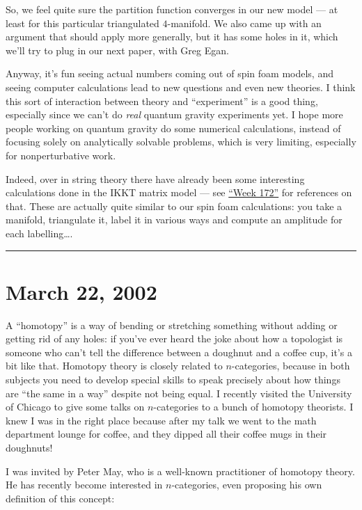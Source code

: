 \documentclass{article}
\begin{document}
So, we feel quite sure the partition function converges in our new model
--- at least for this particular triangulated \(4\)-manifold. We also
came up with an argument that should apply more generally, but it has
some holes in it, which we'll try to plug in our next paper, with Greg
Egan.

Anyway, it's fun seeing actual numbers coming out of spin foam models,
and seeing computer calculations lead to new questions and even new
theories. I think this sort of interaction between theory and
``experiment'' is a good thing, especially since we can't do \emph{real}
quantum gravity experiments yet. I hope more people working on quantum
gravity do some numerical calculations, instead of focusing solely on
analytically solvable problems, which is very limiting, especially for
nonperturbative work.

Indeed, over in string theory there have already been some interesting
calculations done in the IKKT matrix model --- see
\protect\hyperlink{week172}{``Week 172''} for references on that. These
are actually quite similar to our spin foam calculations: you take a
manifold, triangulate it, label it in various ways and compute an
amplitude for each labelling\ldots.

\begin{center}\rule{0.5\linewidth}{0.5pt}\end{center}



\hypertarget{week178}{%
\section{March 22, 2002}\label{week178}}

A ``homotopy'' is a way of bending or stretching something without
adding or getting rid of any holes: if you've ever heard the joke about
how a topologist is someone who can't tell the difference between a
doughnut and a coffee cup, it's a bit like that. Homotopy theory is
closely related to \(n\)-categories, because in both subjects you need
to develop special skills to speak precisely about how things are ``the
same in a way'' despite not being equal. I recently visited the
University of Chicago to give some talks on \(n\)-categories to a bunch
of homotopy theorists. I knew I was in the right place because after my
talk we went to the math department lounge for coffee, and they dipped
all their coffee mugs in their doughnuts!

I was invited by Peter May, who is a well-known practitioner of homotopy
theory. He has recently become interested in \(n\)-categories, even
proposing his own definition of this concept:
\end{document}
